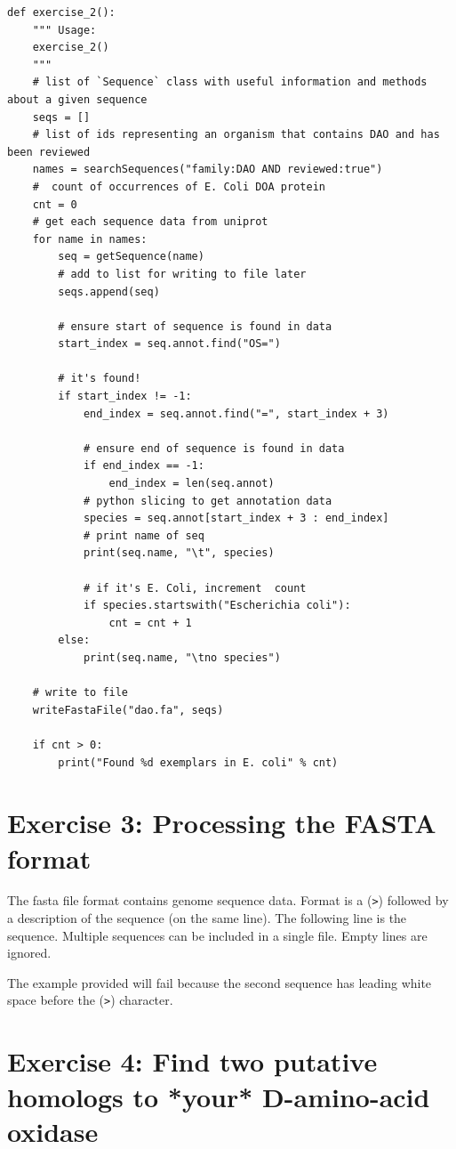 \documentclass{article} %
\begin{document}
\begin{verbatim}
def exercise_2():
    """ Usage: 
    exercise_2()
    """
    # list of `Sequence` class with useful information and methods about a given sequence
    seqs = []
    # list of ids representing an organism that contains DAO and has been reviewed
    names = searchSequences("family:DAO AND reviewed:true")
    #  count of occurrences of E. Coli DOA protein
    cnt = 0
    # get each sequence data from uniprot
    for name in names:
        seq = getSequence(name)
        # add to list for writing to file later
        seqs.append(seq)

        # ensure start of sequence is found in data
        start_index = seq.annot.find("OS=")

        # it's found!
        if start_index != -1:
            end_index = seq.annot.find("=", start_index + 3)

            # ensure end of sequence is found in data
            if end_index == -1:
                end_index = len(seq.annot)
            # python slicing to get annotation data
            species = seq.annot[start_index + 3 : end_index]
            # print name of seq
            print(seq.name, "\t", species)

            # if it's E. Coli, increment  count
            if species.startswith("Escherichia coli"):
                cnt = cnt + 1
        else:
            print(seq.name, "\tno species")

    # write to file
    writeFastaFile("dao.fa", seqs)

    if cnt > 0:
        print("Found %d exemplars in E. coli" % cnt)
\end{verbatim}

\section{Exercise 3: Processing the FASTA format}

The fasta file format contains genome sequence data. Format is a (\verb+>+) followed by a description of the sequence (on the same line). The following line is the sequence. Multiple sequences can be included in a single file. Empty lines are ignored.

The example provided will fail because the second sequence has leading white space before the (\verb+>+) character.

\section{Exercise 4: Find two putative homologs to *your* D-amino-acid oxidase}
\end{document}
